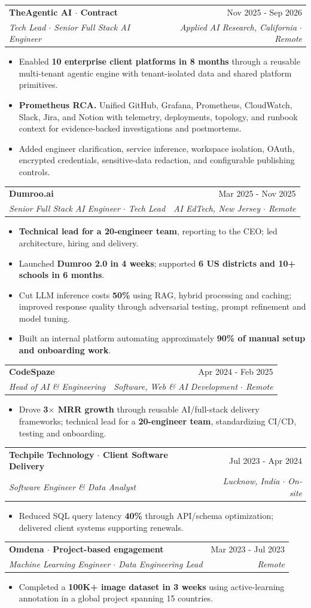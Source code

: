 \documentclass[letterpaper,11pt]{article}
\makeatletter
\newcommand{\resumeItem}[1]{
  \item\small{
    {#1 \vspace{-2pt}}
  }
}
\newcommand{\resumeSubheading}[4]{
  \vspace{-2pt}\item
    \begin{tabular*}{0.97\textwidth}[t]{l@{\extracolsep{\fill}}r}
      \textbf{#1} & #2 \\
      \textit{\small#3} & \textit{\small #4} \\
    \end{tabular*}\vspace{-7pt}
}
\newcommand{\resumeItemListStart}{\begin{itemize}}
\newcommand{\resumeItemListEnd}{\end{itemize}\vspace{-5pt}}
\newcommand{\sep}{\(\cdot\)}
\makeatother
\begin{document}
    \resumeSubheading
      {TheAgentic AI \sep{} Contract}{Nov 2025 - Sep 2026}
      {Tech Lead \sep{} Senior Full Stack AI Engineer}{Applied AI Research, California \sep{} Remote}
      \resumeItemListStart
        \resumeItem{Enabled \textbf{10 enterprise client platforms in 8 months} through a reusable multi-tenant agentic engine with tenant-isolated data and shared platform primitives.}
        \resumeItem{\textbf{Prometheus RCA.} Unified GitHub, Grafana, Prometheus, CloudWatch, Slack, Jira, and Notion with telemetry, deployments, topology, and runbook context for evidence-backed investigations and postmortems.}
        \resumeItem{Added engineer clarification, service inference, workspace isolation, OAuth, encrypted credentials, sensitive-data redaction, and configurable publishing controls.}
      \resumeItemListEnd

    \resumeSubheading
      {Dumroo.ai}{Mar 2025 - Nov 2025}
      {Senior Full Stack AI Engineer \sep{} Tech Lead}{AI EdTech, New Jersey \sep{} Remote}
      \resumeItemListStart
        \resumeItem{\textbf{Technical lead for a 20-engineer team}, reporting to the CEO; led architecture, hiring and delivery.}
        \resumeItem{Launched \textbf{Dumroo 2.0 in 4 weeks}; supported \textbf{6 US districts and 10+ schools in 6 months}.}
        \resumeItem{Cut LLM inference costs \textbf{50\%} using RAG, hybrid processing and caching; improved response quality through adversarial testing, prompt refinement and model tuning.}
        \resumeItem{Built an internal platform automating approximately \textbf{90\% of manual setup and onboarding work}.}
      \resumeItemListEnd

    \resumeSubheading
      {CodeSpaze}{Apr 2024 - Feb 2025}
      {Head of AI \& Engineering}{Software, Web \& AI Development \sep{} Remote}
      \resumeItemListStart
        \resumeItem{Drove \textbf{3$\times$ MRR growth} through reusable AI/full-stack delivery frameworks; technical lead for a \textbf{20-engineer team}, standardizing CI/CD, testing and onboarding.}
      \resumeItemListEnd

    \resumeSubheading
      {Techpile Technology \sep{} Client Software Delivery}{Jul 2023 - Apr 2024}
      {Software Engineer \& Data Analyst}{Lucknow, India \sep{} On-site}
      \resumeItemListStart
        \resumeItem{Reduced SQL query latency \textbf{40\%} through API/schema optimization; delivered client systems supporting renewals.}
      \resumeItemListEnd

    \resumeSubheading
      {Omdena \sep{} Project-based engagement}{Mar 2023 - Jul 2023}
      {Machine Learning Engineer \sep{} Data Engineering Lead}{Remote}
      \resumeItemListStart
        \resumeItem{Completed a \textbf{100K+ image dataset in 3 weeks} using active-learning annotation in a global project spanning 15 countries.}
      \resumeItemListEnd
\end{document}
